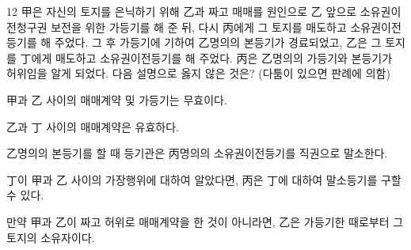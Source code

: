\begin{question}{12}
甲은 자신의 토지를 은닉하기 위해 乙과 짜고 매매를 원인으로 乙 앞으로 소유권이전청구권 보전을 위한 가등기를 해 준 뒤, 다시 丙에게 그 토지를 매도하고 소유권이전등기를 해 주었다. 그 후 가등기에 기하여 乙명의의 본등기가 경료되었고, 乙은 그 토지를 丁에게 매도하고 소유권이전등기를 해 주었다. 丙은 乙명의의 가등기와 본등기가 허위임을 알게 되었다. 다음 설명으로 옳지 않은 것은? (다툼이 있으면 판례에 의함)
\begin{choices}
  \item 甲과 乙 사이의 매매계약 및 가등기는 무효이다.
  \item 乙과 丁 사이의 매매계약은 유효하다.
  \item 乙명의의 본등기를 할 때 등기관은 丙명의의 소유권이전등기를 직권으로 말소한다.
  \item 丁이 甲과 乙 사이의 가장행위에 대하여 알았다면, 丙은 丁에 대하여 말소등기를 구할 수 있다.
  \item 만약 甲과 乙이 짜고 허위로 매매계약을 한 것이 아니라면, 乙은 가등기한 때로부터 그 토지의 소유자이다.
\end{choices}
\end{question}
